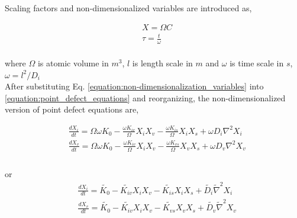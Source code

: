 \documentclass[a4paper]{article}
\begin{document}
Scaling factors and non-dimensionalized variables are introduced as,

\begin{equation}
  \begin{aligned}
    &X = \Omega C\\
    &\tau = \frac{t}{\omega}\\
  \end{aligned}
  \label{equation:non-dimensionalization_variables}
\end{equation}

where ${\Omega}$ is atomic volume in ${m^3}$, ${l}$ is length scale in ${m}$ and ${\omega}$ is time scale in ${s}$, ${\omega= l^2/D_i}$\\

After substituting Eq. \ref{equation:non-dimensionalization_variables} into \ref{equation:point_defect_equations} and reorganizing, the non-dimensionalized version of point defect equations are,

\begin{equation}
  \begin{aligned}
    &\frac{dX_i}{dt} = \Omega\omega K_0 - \frac{\omega K_{iv}}{\Omega}X_iX_v - \frac{\omega K_{is}}{\Omega}X_iX_s + \omega D_i\nabla^2 X_i\\
    &\frac{dX_v}{dt} = \Omega\omega K_0 - \frac{\omega K_{iv}}{\Omega}X_iX_v - \frac{\omega K_{vs}}{\Omega}X_vX_s + \omega D_v\nabla^2 X_v\\
  \end{aligned}
  \label{equation:non-dimensionalized_point_defect_equations}
\end{equation}\\
or
\begin{equation}
  \begin{aligned}
    &\frac{dX_i}{dt} = \widetilde{K_0} - \widetilde{K_{iv}}X_iX_v - \widetilde{K_{is}}X_iX_s + \widetilde{D_i}\widetilde{\nabla}^2 X_i\\
    &\frac{dX_v}{dt} = \widetilde{K_0} - \widetilde{K_{iv}}X_iX_v - \widetilde{K_{vs}}X_vX_s + \widetilde{D_v}\widetilde{\nabla}^2 X_v\\
  \end{aligned}
  \label{equation:non-dimensionalized_point_defect_equations}
\end{equation}\\
\end{document}
